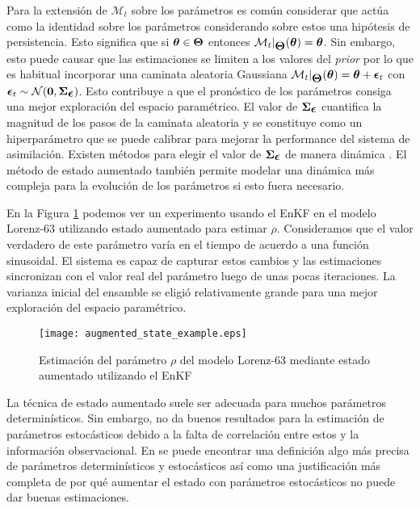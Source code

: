 Para la extensión de $\mathcal{M}_t$ sobre los parámetros es común considerar que actúa como la identidad sobre los parámetros considerando sobre estos una hipótesis de persistencia. Esto significa que si $\mbox{\boldmath$ \theta $} \in \mbox{\boldmath$ \Theta $}$ entonces $\mathcal{M}_t |_{\mbox{\boldmath$ \Theta $}} (\mbox{\boldmath$ \theta $}) = \mbox{\boldmath$ \theta $}$. Sin embargo, esto puede causar que las estimaciones se limiten a los valores del \textit{prior} por lo que es habitual incorporar una caminata aleatoria Gaussiana $\mathcal{M}_t |_{\mbox{\boldmath$ \Theta $}} (\mbox{\boldmath$ \theta $}) = \mbox{\boldmath$ \theta $} + \mbox{\boldmath$ \epsilon $}_t$ con $\mbox{\boldmath$ \epsilon $}_t \sim \mathcal{N}(\mathbf{0}, \mbox{\boldmath$ \Sigma $}_{\mbox{\boldmath$ \epsilon $}})$. Esto contribuye a que el pronóstico de los parámetros consiga una mejor exploración del espacio paramétrico. El valor de $\mbox{\boldmath$ \Sigma $}_{\mbox{\boldmath$ \epsilon $}}$ cuantifica la magnitud de los pasos de la caminata aleatoria y se constituye como un hiperparámetro que se puede calibrar para mejorar la performance del sistema de asimilación. Existen métodos para elegir el valor de $\mbox{\boldmath$ \Sigma $}_{\mbox{\boldmath$ \epsilon $}}$ de manera dinámica \citep{Doucet2001}. El método de estado aumentado también permite modelar una dinámica más compleja para la evolución de los parámetros si esto fuera necesario.

En la Figura \ref{fig:augmented_state_example} podemos ver un experimento usando el EnKF en el modelo Lorenz-63 utilizando estado aumentado para estimar $\rho$. Consideramos que el valor verdadero de este parámetro varía en el tiempo de acuerdo a una función sinusoidal. El sistema es capaz de capturar estos cambios y las estimaciones sincronizan con el valor real del parámetro luego de unas pocas iteraciones. La varianza inicial del ensamble se eligió relativamente grande para una mejor exploración del espacio paramétrico.

\begin{figure}[h]
    \centering
    \texttt{[image: augmented\_state\_example.eps]}
    \caption{Estimación del parámetro $\rho$ del modelo Lorenz-63 mediante estado aumentado utilizando el EnKF}
    \label{fig:augmented_state_example}
\end{figure}

La técnica de estado aumentado suele ser adecuada para muchos parámetros determinísticos. Sin embargo, no da buenos resultados para la estimación de parámetros estocásticos debido a la falta de correlación entre estos y la información observacional. En \cite{Delsole2010} se puede encontrar una definición algo más precisa de parámetros determinísticos y estocásticos así como una justificación más completa de por qué aumentar el estado con parámetros estocásticos no puede dar buenas estimaciones.

